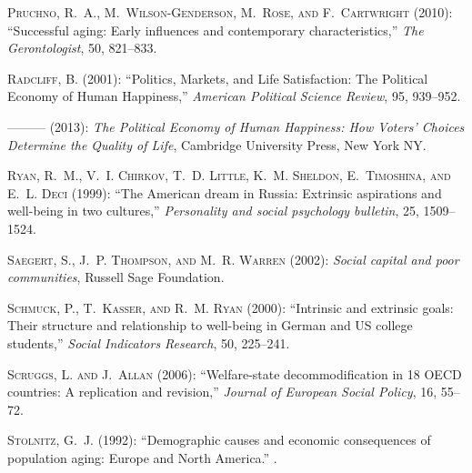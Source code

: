 \documentclass[10pt, letterpaper]{article}
\begin{document}
\begin{spacing}{1.4}
\begin{thebibliography}{91}
\textsc{Pruchno, R.~A., M.~Wilson-Genderson, M.~Rose, and F.~Cartwright}
  (2010{}): \enquote{Successful aging: Early influences and
  contemporary characteristics,} \emph{The Gerontologist}, 50, 821--833.

\textsc{Radcliff, B.} (2001): \enquote{Politics, Markets, and Life
  Satisfaction: The Political Economy of Human Happiness,} \emph{American
  Political Science Review}, 95, 939--952.

---\hspace{-.1pt}---\hspace{-.1pt}--- (2013): \emph{The Political Economy of
  Human Happiness: How Voters' Choices Determine the Quality of Life},
  Cambridge University Press, New York NY.

\textsc{Ryan, R.~M., V.~I. Chirkov, T.~D. Little, K.~M. Sheldon, E.~Timoshina,
  and E.~L. Deci} (1999): \enquote{The American dream in Russia: Extrinsic
  aspirations and well-being in two cultures,} \emph{Personality and social
  psychology bulletin}, 25, 1509--1524.

\textsc{Saegert, S., J.~P. Thompson, and M.~R. Warren} (2002): \emph{Social
  capital and poor communities}, Russell Sage Foundation.

\textsc{Schmuck, P., T.~Kasser, and R.~M. Ryan} (2000): \enquote{Intrinsic and
  extrinsic goals: Their structure and relationship to well-being in German and
  US college students,} \emph{Social Indicators Research}, 50, 225--241.

\textsc{Scruggs, L. and J.~Allan} (2006): \enquote{Welfare-state
  decommodification in 18 OECD countries: A replication and revision,}
  \emph{Journal of European Social Policy}, 16, 55--72.

\textsc{Stolnitz, G.~J.} (1992): \enquote{Demographic causes and economic
  consequences of population aging: Europe and North America.} .


\end{thebibliography}
\end{spacing}
\end{document}
